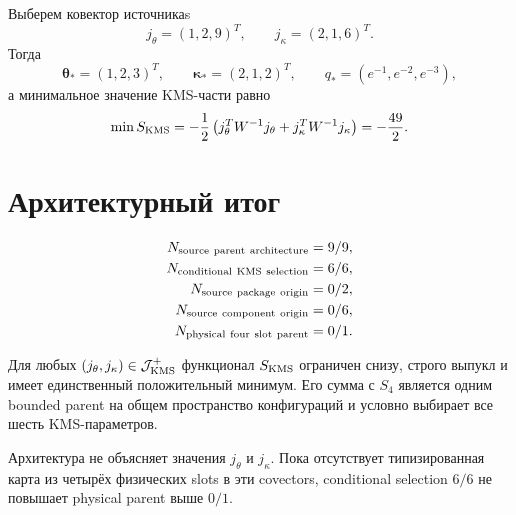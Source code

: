Выберем ковектор источникаs
\begin{equation}
 j_\theta=(1,2,9)^T,
 \qquad
 j_\kappa=(2,1,6)^T.
 \label{eq:v9-kms-source-parent-witness-sources}
\end{equation}
Тогда
\begin{equation}
 \boldsymbol\theta_*=(1,2,3)^T,
 \qquad
 \boldsymbol\kappa_*=(2,1,2)^T,
 \qquad
 q_*=(e^{-1},e^{-2},e^{-3}),
 \label{eq:v9-kms-source-parent-witness-minimum}
\end{equation}
а минимальное значение KMS-части равно
\begin{equation}
 \min S_{\rm KMS}
 =-\frac12\left(j_\theta^TW^{-1}j_\theta
 +j_\kappa^TW^{-1}j_\kappa\right)
 =-\frac{49}{2}.
 \label{eq:v9-kms-source-parent-witness-value}
\end{equation}

\section{Архитектурный итог}

\begin{equation}
 \begin{aligned}
 N_{\rm source\ parent\ architecture}&=9/9,\\
 N_{\rm conditional\ KMS\ selection}&=6/6,\\
 N_{\rm source\ package\ origin}&=0/2,\\
 N_{\rm source\ component\ origin}&=0/6,\\
 N_{\rm physical\ four\ slot\ parent}&=0/1.
 \end{aligned}
 \label{eq:v9-kms-source-parent-ledger}
\end{equation}

\begin{theorem}
Для любых $(j_\theta,j_\kappa)\in\mathcal J_{\rm KMS}^{+}$ функционал
$S_{\rm KMS}$ ограничен снизу, строго выпукл и имеет единственный
положительный минимум. Его сумма с $S_4$ является одним bounded parent на
общем пространство конфигураций и условно выбирает все шесть KMS-параметров.
\end{theorem}

\begin{nogocriterion}
Архитектура не объясняет значения $j_\theta$ и $j_\kappa$. Пока отсутствует
типизированная карта из четырёх физических slots в эти covectors,
conditional selection $6/6$ не повышает physical parent выше $0/1$.
\end{nogocriterion}

